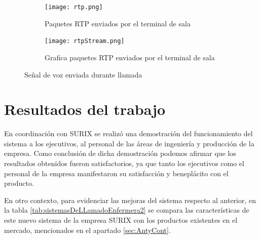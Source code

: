 \begin{figure}[htpb]
	\centering
   	\begin{subfigure}[b]{1\textwidth}
   		\centering
      	\texttt{[image: rtp.png]}
      	\caption{Paquetes RTP enviados por el terminal de sala}
      	\label{fig:PsrtpA}
   	\end{subfigure}%
   	\newline
   	\begin{subfigure}[b]{1\textwidth}
   		\centering
      	\texttt{[image: rtpStream.png]}
      	\caption{Grafica paquetes RTP enviados por el terminal de sala}
      	\label{fig:PsrtpB}
   	\end{subfigure}%
	\caption{Señal de voz enviada durante llamada}
	\label{fig:Psrtp}
\end{figure}

\section{Resultados del trabajo}
\label{sec:resTrab}

En coordinación con SURIX se realizó una demostración del funcionamiento del sistema a los ejecutivos, al personal de las áreas de ingeniería y producción de la empresa. Como conclusión de dicha demostración podemos afirmar que los resultados obtenidos fueron satisfactorios, ya que tanto los ejecutivos como el personal de la empresa manifestaron su satisfacción y beneplácito con el producto.

En otro contexto, para evidenciar las mejoras del sistema respecto al anterior, en la tabla \ref{tab:sistemasDeLLamadoEnfermera2} se compara las características de este nuevo sistema de la empresa SURIX con los productos existentes en el mercado, mencionados en el apartado \ref{sec:AntyCont}. 


